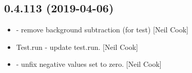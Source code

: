 \documentclass[a4paper,10pt,english]{report}
\begin{document}
\subsection{0.4.113 (2019-04-06)}
\label{\detokenize{misc/changelog:id148}}\begin{itemize}
\item {} 
 - remove background subtraction (for test) {[}Neil
Cook{]}

\item {} 
Test.run - update test.run. {[}Neil Cook{]}

\item {} 
 - unfix negative values set to zero. {[}Neil Cook{]}

\end{itemize}
\end{document}
